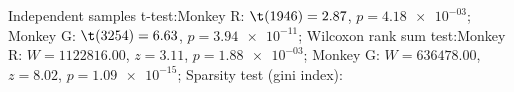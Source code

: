 Independent samples t-test:Monkey R: $\t(1946) = 2.87$, $p = \num{4.18e-03}$; 
Monkey G: $\t(3254) = 6.63$, $p = \num{3.94e-11}$; 
Wilcoxon rank sum test:Monkey R: $W = 1122816.00$, $z = 3.11$, $p = \num{1.88e-03}$; 
Monkey G: $W = 636478.00$, $z = 8.02$, $p = \num{1.09e-15}$; 
Sparsity test (gini index):